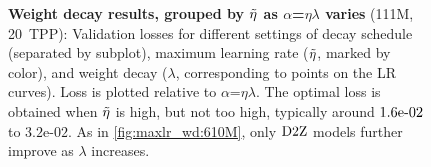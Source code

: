 \begin{figure}
  \centering
  \vspace{0mm}
  \caption{\textbf{Weight decay results, grouped by $\tilde{\eta}$ as
      $\alpha$=$\eta\lambda$ varies} (111M, 20~TPP):
    Validation losses for different settings of decay schedule
    (separated by subplot), maximum learning rate ($\tilde{\eta}$, marked
    by color), and weight decay ($\lambda$, corresponding to points on
    the LR curves).  Loss is plotted relative to
    $\alpha$=$\eta\lambda$.  The optimal loss is obtained when
    $\tilde{\eta}$ is high, but not too high, typically around $1.6\mbox{e-}02$ to
    $3.2$e-$02$.  As in \cref{fig:maxlr_wd:610M}, only $\mbox{D2Z}$ models
    further improve as $\lambda$ increases.\label{fig:maxlr_wd:111M}}
\end{figure}

